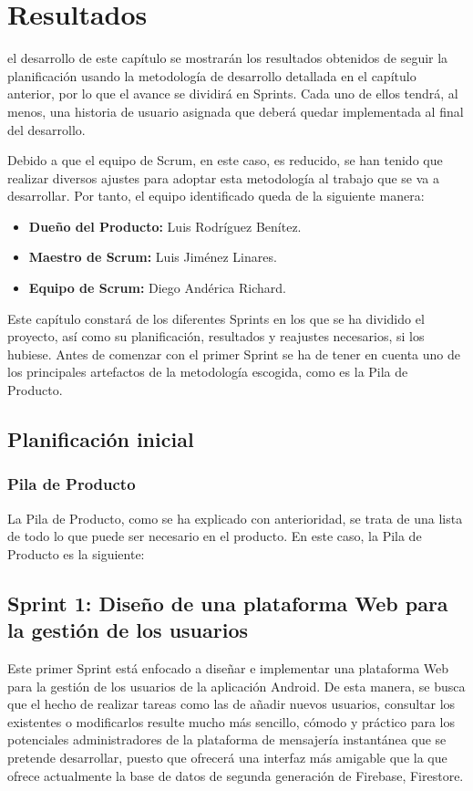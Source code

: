 \chapter{Resultados}
\label{chap:resultados}

 el desarrollo de este capítulo se mostrarán los resultados obtenidos de seguir la planificación usando la metodología de desarrollo detallada en el capítulo anterior, por lo que el avance se dividirá en Sprints. Cada uno de ellos tendrá, al menos, una historia de usuario asignada que deberá quedar implementada al final del desarrollo.

Debido a que el equipo de Scrum, en este caso, es reducido, se han tenido que realizar diversos ajustes para adoptar esta metodología al trabajo que se va a desarrollar. Por tanto, el equipo identificado queda de la siguiente manera:

\begin{itemize}
	\item \textbf{Dueño del Producto:} Luis Rodríguez Benítez.
	\item \textbf{Maestro de Scrum:} Luis Jiménez Linares.
	\item \textbf{Equipo de Scrum:} Diego Andérica Richard.
\end{itemize}

Este capítulo constará de los diferentes Sprints en los que se ha dividido el proyecto, así como su planificación, resultados y reajustes necesarios, si los hubiese. Antes de comenzar con el primer Sprint se ha de tener en cuenta uno de los principales artefactos de la metodología escogida, como es la Pila de Producto.

\section{Planificación inicial}
\subsection{Pila de Producto}
La Pila de Producto, como se ha explicado con anterioridad, se trata de una lista de todo lo que puede ser necesario en el producto. En este caso, la Pila de Producto es la siguiente:

\section{Sprint 1: Diseño de una plataforma Web para la gestión de los usuarios}
Este primer Sprint está enfocado a diseñar e implementar una plataforma Web para la gestión de los usuarios de la aplicación Android. De esta manera, se busca que el hecho de realizar tareas como las de añadir nuevos usuarios, consultar los existentes o modificarlos resulte mucho más sencillo, cómodo y práctico para los potenciales administradores de la plataforma de mensajería instantánea que se pretende desarrollar, puesto que ofrecerá una interfaz más amigable que la que ofrece actualmente la base de datos de segunda generación de Firebase, Firestore.

